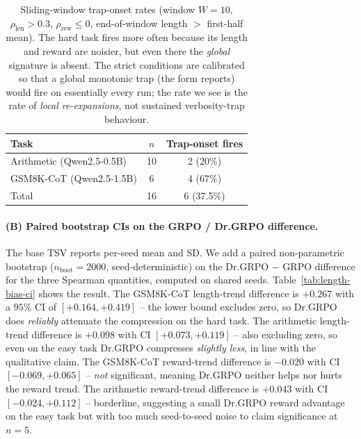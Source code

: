 \documentclass{article}
\begin{document}
\begin{table}[htbp]
\centering
\small
\begin{tabular}{lcc}
\toprule
Task & $n$ & Trap-onset fires \\
\midrule
Arithmetic (Qwen2.5-0.5B)   & 10 & 2 (20\%) \\
GSM8K-CoT (Qwen2.5-1.5B)   & 6  & 4 (67\%) \\
\midrule
Total & 16 & 6 (37.5\%) \\
\bottomrule
\end{tabular}
\caption{Sliding-window trap-onset rates (window $W{=}10$,
$\rho_\text{len}>0.3$, $\rho_\text{rew}\le 0$, end-of-window
length $>$ first-half mean). The hard task fires more often
because its length and reward are noisier, but even there the
\emph{global} signature is absent. The strict conditions are
calibrated so that a global monotonic trap (the form
\cite{tong2025drgrpo} reports) would fire on essentially every
run; the rate we see is the rate of \emph{local re-expansions},
not sustained verbosity-trap behaviour.}
\label{tab:length-bias-trap-rate}
\end{table}

\paragraph{(B) Paired bootstrap CIs on the GRPO / Dr.GRPO difference.}
The base TSV reports per-seed mean and SD. We add a paired
non-parametric bootstrap ($n_\text{boot}=2000$, seed-deterministic)
on the Dr.GRPO $-$ GRPO difference for the three Spearman
quantities, computed on shared seeds. Table~\ref{tab:length-bias-ci}
shows the result. The GSM8K-CoT length-trend difference is
$+0.267$ with a $95\%$ CI of $[+0.164, +0.419]$ -- the lower
bound excludes zero, so Dr.GRPO does \emph{reliably} attenuate
the compression on the hard task. The arithmetic length-trend
difference is $+0.098$ with CI $[+0.073, +0.119]$ -- also
excluding zero, so even on the easy task Dr.GRPO compresses
\emph{slightly less}, in line with the qualitative claim. The
GSM8K-CoT reward-trend difference is $-0.020$ with CI
$[-0.069, +0.065]$ -- \emph{not} significant, meaning Dr.GRPO
neither helps nor hurts the reward trend. The arithmetic
reward-trend difference is $+0.043$ with CI $[-0.024, +0.112]$ --
borderline, suggesting a small Dr.GRPO reward advantage on the
easy task but with too much seed-to-seed noise to claim
significance at $n{=}5$.
\end{document}

